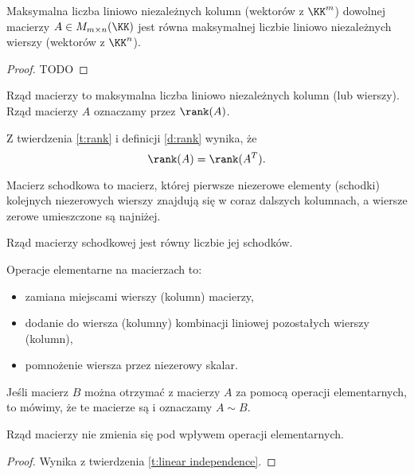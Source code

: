\begin{theorem}
    \label{t:rank}
    Maksymalna liczba liniowo niezależnych kolumn (wektorów z $\KK^m$) dowolnej macierzy $A \in M_{m\times n}(\KK)$ jest równa maksymalnej liczbie liniowo niezależnych wierszy (wektorów z $\KK^n$).
\end{theorem}
\begin{proof}
    TODO
\end{proof}

\begin{definition}
    \label{d:rank}
    Rząd macierzy to maksymalna liczba liniowo niezależnych kolumn (lub wierszy). Rząd macierzy $A$ oznaczamy przez $\rank (A)$.
\end{definition}

Z twierdzenia \ref{t:rank} i definicji \ref{d:rank} wynika, że
\[ \rank(A) = \rank(A^T). \]

\begin{definition}
    Macierz schodkowa to macierz, której pierwsze niezerowe elementy (schodki) kolejnych niezerowych wierszy znajdują się w coraz dalszych kolumnach, a wiersze zerowe umieszczone są najniżej.
\end{definition}

\begin{fact}
    Rząd macierzy schodkowej jest równy liczbie jej schodków.
\end{fact}

\begin{definition}
    Operacje elementarne na macierzach to:
    \begin{itemize}
        \item zamiana miejscami wierszy (kolumn) macierzy,
        \item dodanie do wiersza (kolumny) kombinacji liniowej pozostałych wierszy (kolumn),
        \item pomnożenie wiersza przez niezerowy skalar.
    \end{itemize}
    Jeśli macierz $B$ można otrzymać z macierzy $A$ za pomocą operacji elementarnych, to mówimy, że te macierze są  i oznaczamy $A \sim B$.
\end{definition}

\begin{fact}
    Rząd macierzy nie zmienia się pod wpływem operacji elementarnych.
\end{fact}
\begin{proof}
    Wynika z twierdzenia \ref{t:linear independence}.
\end{proof}

